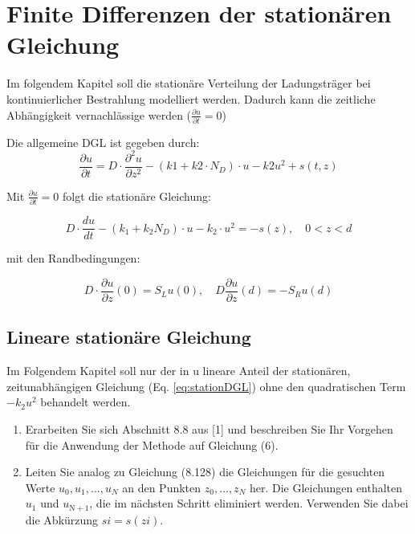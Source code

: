 \chapter{Finite Differenzen der stationären Gleichung}
Im folgendem Kapitel soll die stationäre Verteilung der Ladungsträger bei kontinuierlicher Bestrahlung modelliert werden. 
Dadurch kann die zeitliche Abhängigkeit vernachlässige werden ($\frac{\partial u}{\partial t}=0$)
 
Die allgemeine DGL ist gegeben durch:
\begin{equation}
	\frac{\partial u}{\partial t}= D\cdot\frac{\partial ^2 u }{\partial z^2}-(k1+k2\cdot N_D)\cdot u -k2u^2 +s(t,z)
\end{equation}

Mit $\frac{\partial u}{\partial t}=0$ folgt die stationäre Gleichung:

\begin{equation}\label{eq:stationDGL}
	D\cdot \frac{du}{dt} -\left( k_1 +k_2 N_D\right)\cdot u-k_2\cdot u^2=-s(z), \quad 0 <z<d
\end{equation}

mit den Randbedingungen:

\begin{equation}
	D\cdot \frac{\partial u}{\partial z}(0)=S_Lu(0),\quad D\frac{\partial u}{\partial z}(d)=-S_Ru(d)
\end{equation}
\section{Lineare stationäre Gleichung}
Im Folgendem Kapitel soll nur der in u lineare Anteil der stationären, zeitunabhängigen Gleichung (Eq. \ref{eq:stationDGL}) ohne den quadratischen Term $-k_2u^2$ behandelt werden\cite{Prof.Dr.AndreasZeiser.April2021}.

\begin{enumerate}
	\item Erarbeiten Sie sich Abschnitt 8.8 aus [1] und beschreiben Sie Ihr Vorgehen für die Anwendung der Methode auf Gleichung (6).
	
\begin{comment}
	Mit der Verwendung dieser Methode auf die Gleichung 6 lässt sich eine Matrix berechnen, womit man die zeitabhängige Stelle der Leitungsträgerdichte u mathematisch beschreiben kann. Dadurch kann ein Modell aus der Diskretisierung der Methode erstellt, das die lange dieser Ladungsträgerdichte an einer Zeit beschreibt.
\end{comment}	
	
	
	
	\item Leiten Sie analog zu Gleichung (8.128) die Gleichungen für die gesuchten Werte  $u_0, u_1, \dots , u_N$ an den Punkten $z_0, \dots , z_N$ her. Die Gleichungen enthalten $u_1$ und $u_\mathrm{N+1}$, die im nächsten Schritt eliminiert werden. Verwenden Sie dabei die Abkürzung $ si = s(zi)$.
\end{enumerate}
 

